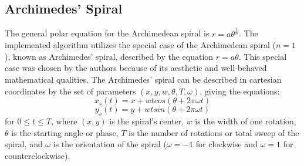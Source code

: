 \documentclass[11pt]{article}
\begin{document}
\subsection{Archimedes' Spiral}	
	The general polar equation for the Archimedean spiral is \begin{math}r = a\theta^\frac{1}{n}\end{math}. The implemented algorithm utilizes the special case of the Archimedean spiral (\begin{math}n=1\end{math}), known as Archimedes' spiral, described by the equation \begin{math}r = a\theta\end{math}. This special case was chosen by the authors because of its aesthetic and well-behaved mathematical qualities.\cite{Browne2006834} The Archimedes' spiral can be described in cartesian coordinates by the set of parameters \begin{math}(x,y,w,\theta,T,\omega)\end{math}, giving the equations:
	\begin{equation}x_{s}(t) = x + wt cos(\theta + 2\pi\omega t)\end{equation}
	\begin{equation}y_{s}(t) = y + wt sin(\theta + 2\pi\omega t)\end{equation}
for \begin{math}0 \leq t \leq T\end{math}, where \begin{math}(x,y)\end{math} is the spiral's center, \begin{math}w\end{math} is the width of one rotation, \begin{math}\theta\end{math} is the starting angle or phase, \begin{math}T\end{math} is the number of rotations or total sweep of the spiral, and \begin{math}\omega\end{math} is the orientation of the spiral (\begin{math}\omega = -1\end{math} for clockwise and \begin{math}\omega = 1\end{math} for counterclockwise).
\end{document}
